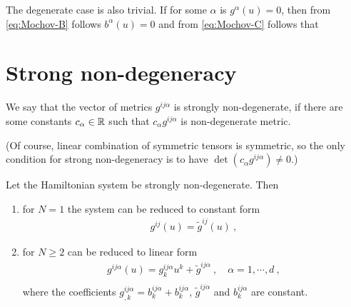 The degenerate case is also trivial. If for some $\alpha$ is $g^\alpha(u) = 0$, then from \eqref{eq:Mochov-B} follows $b^\alpha(u) = 0$ and from \eqref{eq:Mochov-C} follows that 


\section{Strong non-degeneracy}

\begin{definition}
    We say that the vector of metrics $g^{ij \alpha}$ is strongly non-degenerate, if there are some constants $c_\alpha \in \mathbb{R}$ such that $c_\alpha g^{ij \alpha}$ is non-degenerate metric.
\end{definition}
(Of course, linear combination of symmetric tensors is symmetric, so the only condition for strong non-degeneracy is to have $\det (c_\alpha g^{ij \alpha}) \neq 0$.)

\begin{theorem}
    Let the Hamiltonian system be strongly non-degenerate. Then
    \begin{enumerate}
        \item for $N=1$ the system can be reduced to constant form
        \begin{align}
            g^{ij}(u) = \tilde g^{ij}(u) \:,
        \end{align}

        \item for $N \geq 2$ can be reduced to linear form
        \begin{align}
            g^{ij \alpha}(u) = g^{ij \alpha}_k u^k + \tilde g^{ij \alpha} \:, \quad \alpha = 1, \cdots , d \:, \\
        \end{align}
        where the coefficients $g^{ij \alpha}_{,k} = b^{ij \alpha}_k + b^{ij \alpha}_k$, $\tilde g^{ij \alpha}$ and $b^{ij \alpha}_k$ are constant.
    \end{enumerate}
\end{theorem}
